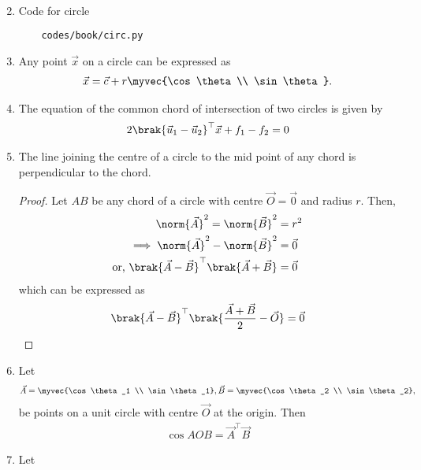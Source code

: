 \begin{enumerate}[label=\thesubsection.\arabic*.,ref=\thesubsection.\theenumi]
\begin{align}
{	}
	\label{eq:chapters/11/11/1/mat-3}
                     \end{align}
\item Code for circle
	\begin{lstlisting}
	codes/book/circ.py
\end{lstlisting}
		     \iffalse
\item Any point $\vec{x}$ on a circle can be expressed as
\begin{align}
\vec{x} = \vec{c} + r\myvec{\cos \theta \\ \sin \theta}.
	\label{eq:circ-polar}
\end{align}
\item The equation of the common chord of intersection of two  circles is given by 
\begin{align}
	2\brak{\vec{u}_1
	   -\vec{u}_2}^{\top}\vec{x} + f_1 - f_2 = 0
	\label{eq:circ-chord}
\end{align}
\item The line joining the centre of a circle to the mid point of any chord is perpendicular to the chord.
	\label{prop:circ-chord-perp}
	\begin{proof}
	Let $AB$ be any chord of a circle with centre $\vec{O}= \vec{0}$ and radius $r$.  Then, 
\begin{align}
	\norm{\vec{A}}^2 
	=\norm{\vec{B}}^2  &= r^2
	\\
	\implies 
	\norm{\vec{A}}^2 
	-\norm{\vec{B}}^2  &=\vec{0}
	\\
	\text{or, }\brak{\vec{A}-\vec{B}}^{\top}\brak{\vec{A}+\vec{B}} &= \vec{0}
\end{align}
which can be expressed as 
\begin{align}
	\brak{\vec{A}-\vec{B}}^{\top}\brak{\frac{\vec{A}+\vec{B}}{2}-\vec{O}} = \vec{0}
\end{align}
	\end{proof}
\item Let 
\begin{align}
\vec{A} =  \myvec{\cos \theta_1 \\ \sin \theta_1},
\vec{B} =  \myvec{\cos \theta_2 \\ \sin \theta_2},
\end{align}
 be points on  a unit circle with centre $\vec{O}$ at the origin.  Then
\begin{align}
	\label{eq:circ-ang-centre}
	\cos AOB = \vec{A}^{\top}\vec{B} 
\end{align}
\item Let 
\begin{align}

\end{align}
\end{enumerate}
